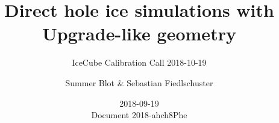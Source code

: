 \documentclass[green, 12pt]{beamer}
\title{Direct hole ice simulations with Upgrade-like geometry}
\subtitle{IceCube Calibration Call 2018-10-19}
\date{2018-09-19 \\ \vspace*{2mm} \tiny{Document 2018-ahch8Phe}}
\author[Summer Blot, DESY \& Sebastian Fiedlschuster, ECAP]{Summer Blot \& Sebastian Fiedlschuster}
\institute{Deutsches Elektronen-Synchrotron\\Erlangen Centre for Astroparticle Physics}
\newif\ifplacelogo %
\begin{document}



\placelogofalse



%   
%
%
%     
%
%     
%     
%     
%     
%     
%
%     
%
%     
%
%   
%
%
\end{document}
